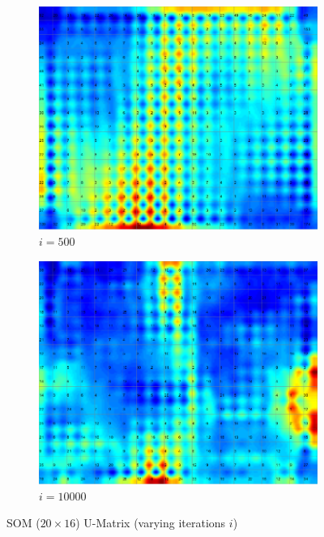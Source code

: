 \documentclass{acm_proc_article-sp}
\begin{document}
\begin{figure}
    \begin{subfigure}[b]{0.24\linewidth}
        \includegraphics[width=\linewidth]{img/wine-newmid-u-matrix-i-500}
        \caption{$i=500$}
        \label{fig:wine-newmid-u-matrix-i-500}
    \end{subfigure}
    \begin{subfigure}[b]{0.24\linewidth}
        \includegraphics[width=\linewidth]{img/wine-newmid-u-matrix-i-10000}
        \caption{$i=10000$}
        \label{fig:wine-newmid-u-matrix-i-10000}
    \end{subfigure}
    \caption{SOM ($20\times16$) U-Matrix (varying iterations $i$)}
    \label{fig:wine-newmid-u-matrix-i}
\end{figure}
\end{document}

